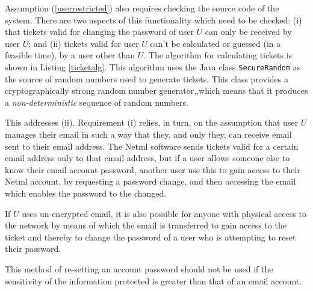 Assumption (\ref{userrestricted}) also requires checking the source code of the system.
There are two aspects of this functionality which need to be checked: (i) that tickets
valid for changing the password of user $U$ can only be received by user $U$; and (ii)
tickets valid for user $U$ can't be calculated or guessed (in a feasible time), by a
user other than $U$. The algorithm for calculating tickets is shown in Listing \ref{ticketalg}.
This algorithm uses the Java class \verb|SecureRandom| as the source of random numbers
used to generate tickets. This class provides a cryptographically strong 
random number generator\iflonger \cite{SecureRandomJavadoc},\else,\fi which means that it produces 
a {\em non-deterministic} sequence of random numbers.

This addresses (ii). Requirement (i) relies, in turn, on the assumption that
user $U$ manages their email in such a way that they, and only they, can receive email
sent to their email address. The Netml software sends tickets valid for a certain email
address only to that email address, but if a user allows someone else to know their email
account password, another user use this to gain access to their Netml account, by requesting
a password change, and then accessing the email which enables the password to the changed.

If $U$ uses un-encrypted email, it is also possible for anyone with physical
access to the network by means of which the email is transferred to gain access
to the ticket and thereby to change the password of a user who is attempting to 
reset their password.

This method of re-setting an account password should not be used if the sensitivity of
the information protected is greater than that of an email account.

